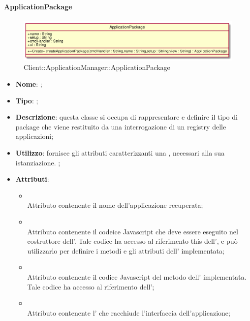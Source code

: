 \hypertarget{ApplicationPackage_label}{\paragraph{ApplicationPackage}}
\begin{figure}[h]
	\centering
	\includegraphics[width=\textwidth,height=\textheight,keepaspectratio]{images/ClassApplicationPackage.png}
	\caption{Client::ApplicationManager::ApplicationPackage}
\end{figure}
\begin{itemize}
	\item \textbf{Nome}: ;
	\item \textbf{Tipo}: ;
	\item \textbf{Descrizione}: questa classe si occupa di rappresentare e definire il tipo di package che viene restituito da una interrogazione di un registry delle applicazioni;
	\item \textbf{Utilizzo}: fornisce gli attributi caratterizzanti una , necessari alla sua istanziazione. ;
	\item \textbf{Attributi}:
	\begin{itemize}
		\item[]  \\
		Attributo contenente il nome dell'applicazione recuperata;
		\item[]  \\
		Attributo contenente il codeice Javascript che deve essere eseguito nel costruttore dell'. Tale codice ha accesso al riferimento this dell', e può utilizzarlo per definire i metodi e gli attributi dell' implementata;
		\item[]  \\
		Attributo contenente il codice Javascript del metodo  dell' implementata. Tale codice ha accesso al riferimento  dell';
		\item[]  \\
		Attributo contenente l' che racchiude l'interfaccia dell'applicazione;

\end{itemize}
\end{itemize}
